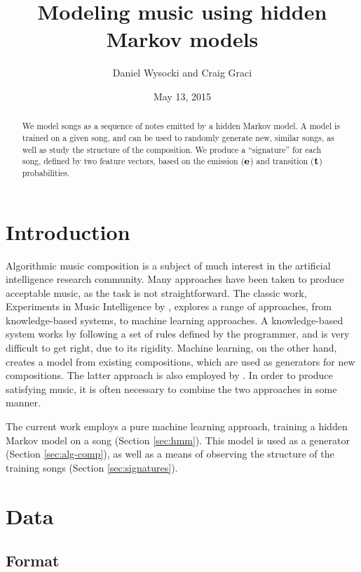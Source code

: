 \documentclass[12pt]{article}
\author{Daniel Wysocki and Craig Graci}
\title{Modeling music using hidden Markov models}
\date{May 13, 2015}
\begin{document}
\maketitle

\begin{abstract}

  We model songs as a sequence of notes emitted by a hidden Markov model.
  A model is trained on a given song, and can be used to randomly generate new,
  similar songs, as well as study the structure of the composition.
  We produce a ``signature'' for each song, defined by two feature vectors,
  based on the emission ($\vb{e}$) and transition ($\vb{t}$) probabilities.

\end{abstract}

\section{Introduction}

Algorithmic music composition is a subject of much interest in the artificial
intelligence research community. Many approaches have been taken to produce
acceptable music, as the task is not straightforward. The classic work,
Experiments in Music Intelligence by \textcite{cope1996}, explores a range of
approaches, from knowledge-based systems, to machine learning approaches.
A knowledge-based system works by following a set of rules defined by the
programmer, and is very difficult to get right, due to its rigidity. Machine
learning, on the other hand, creates a model from existing compositions, which
are used as generators for new compositions. The latter approach is also
employed by \textcite{marchini2011}. In order to produce satisfying music, it
is often necessary to combine the two approaches in some manner.

The current work employs a pure machine learning approach, training a hidden
Markov model \parencite{rabiner1989} on a song (Section \ref{sec:hmm}). This
model is used as a generator (Section \ref{sec:alg-comp}), as well as a means
of observing the structure of the training songs
(Section \ref{sec:signatures}).


\section{Data}

\subsection{Format}
\end{document}
